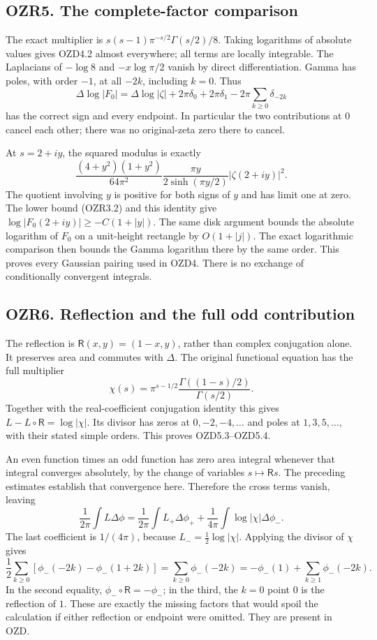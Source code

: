 \subsection{OZR5. The complete-factor
comparison}\label{ozr5.-the-complete-factor-comparison}

The exact multiplier is \(s(s-1)\pi^{-s/2}\Gamma(s/2)/8\). Taking
logarithms of absolute values gives OZD4.2 almost everywhere; all terms
are locally integrable. The Laplacians of \(-\log8\) and \(-x\log\pi/2\)
vanish by direct differentiation. Gamma has poles, with order \(-1\), at
all \(-2k\), including \(k=0\). Thus \[
\Delta\log|F_0|=\Delta\log|\zeta|
+2\pi\delta_0+2\pi\delta_1
-2\pi\sum_{k\ge0}\delta_{-2k}
\] has the correct sign and every endpoint. In particular the two
contributions at \(0\) cancel each other; there was no original-zeta
zero there to cancel.

At \(s=2+iy\), the squared modulus is exactly \[
\frac{(4+y^2)(1+y^2)}{64\pi^2}
\frac{\pi y}{2\sinh(\pi y/2)}|\zeta(2+iy)|^2.
\] The quotient involving \(y\) is positive for both signs of \(y\) and
has limit one at zero. The lower bound (OZR3.2) and this identity give
\(\log|F_0(2+iy)|\ge-C(1+|y|)\). The same disk argument bounds the
absolute logarithm of \(F_0\) on a unit-height rectangle by
\(O(1+|j|)\). The exact logarithmic comparison then bounds the Gamma
logarithm there by the same order. This proves every Gaussian pairing
used in OZD4. There is no exchange of conditionally convergent
integrals.

\subsection{OZR6. Reflection and the full odd
contribution}\label{ozr6.-reflection-and-the-full-odd-contribution}

The reflection is \(\mathsf R(x,y)=(1-x,y)\), rather than complex
conjugation alone. It preserves area and commutes with \(\Delta\). The
original functional equation has the full multiplier \[
\chi(s)=\pi^{s-1/2}\frac{\Gamma((1-s)/2)}{\Gamma(s/2)}.
\] Together with the real-coefficient conjugation identity this gives
\(L-L\circ\mathsf R=\log|\chi|\). Its divisor has zeros at
\(0,-2,-4,\ldots\) and poles at \(1,3,5,\ldots\), with their stated
simple orders. This proves OZD5.3--OZD5.4.

An even function times an odd function has zero area integral whenever
that integral converges absolutely, by the change of variables
\(s\mapsto\mathsf R s\). The preceding estimates establish that
convergence here. Therefore the cross terms vanish, leaving \[
\frac1{2\pi}\int L\Delta\phi
=\frac1{2\pi}\int L_+\Delta\phi_+
+\frac1{4\pi}\int\log|\chi|\Delta\phi_-.
\] The last coefficient is \(1/(4\pi)\), because
\(L_-=\tfrac12\log|\chi|\). Applying the divisor of \(\chi\) gives \[
\frac12\sum_{k\ge0}[\phi_-(-2k)-\phi_-(1+2k)]
=\sum_{k\ge0}\phi_-(-2k)
=-\phi_-(1)+\sum_{k\ge1}\phi_-(-2k).
\tag{OZR6.1}
\] In the second equality, \(\phi_-\circ\mathsf R=-\phi_-\); in the
third, the \(k=0\) point \(0\) is the reflection of \(1\). These are
exactly the missing factors that would spoil the calculation if either
reflection or endpoint were omitted. They are present in OZD.

